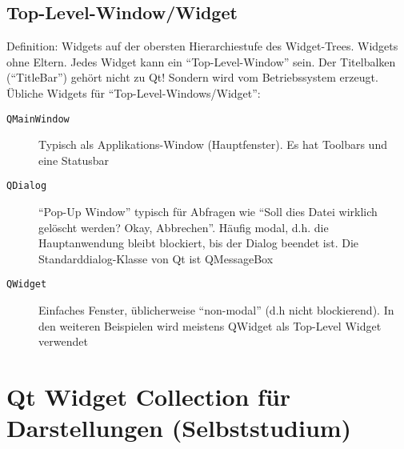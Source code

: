 \subsection{Top-Level-Window/Widget}
Definition: Widgets auf der obersten Hierarchiestufe des Widget-Trees. Widgets ohne Eltern. Jedes Widget kann ein ``Top-Level-Window'' sein. Der Titelbalken (``TitleBar'') gehört nicht zu Qt! Sondern wird vom Betriebssystem erzeugt. Übliche Widgets für ``Top-Level-Windows/Widget'':
\begin{description}
    \item[\texttt{QMainWindow}] Typisch als Applikations-Window (Hauptfenster). Es hat Toolbars und eine Statusbar

    \item[\texttt{QDialog}] ``Pop-Up Window'' typisch für Abfragen wie ``Soll dies Datei wirklich gelöscht werden? Okay, Abbrechen''. Häufig modal, d.h. die Hauptanwendung bleibt blockiert, bis der Dialog beendet ist. Die Standarddialog-Klasse von Qt ist QMessageBox

    \item[\texttt{QWidget}] Einfaches Fenster, üblicherweise ``non-modal'' (d.h nicht blockierend). In den weiteren Beispielen wird meistens QWidget als Top-Level Widget verwendet
\end{description}

\section{Qt Widget Collection für Darstellungen (Selbststudium)}

